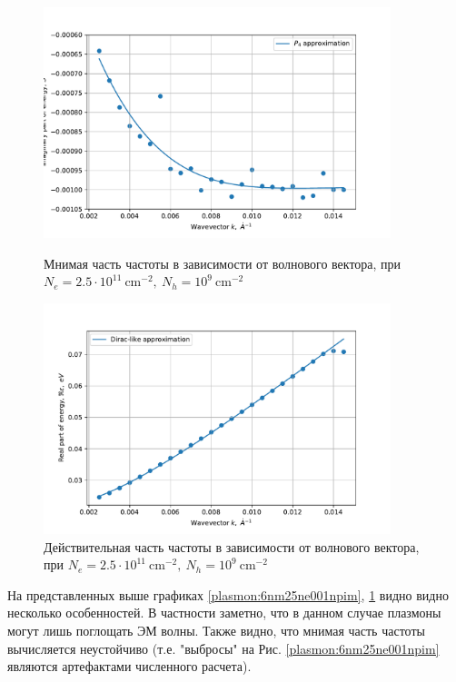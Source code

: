 \documentclass[../main.tex]{subfiles}
\begin{document}
    \begin{figure}[h]
        \begin{minipage}[h]{0.49\textwidth}
            \includegraphics[width=0.9\textwidth]{./images/plasmon_6nm_25_001_im.pdf}
            \caption{Мнимая часть частоты в зависимости от волнового вектора, при $N_e = 2.5 \cdot 10^{11}~\text{cm}^{-2},~N_h = 10^9~\text{cm}^{-2}$
            \label{plasmon:6nm25ne001npim}}
        \end{minipage}
        \hfill
        \begin{minipage}[h]{0.49\textwidth}
            \includegraphics[width=0.9\textwidth]{./images/plasmon_6nm_25_001_re.pdf}
            \caption{Действительная часть частоты в зависимости от волнового вектора, при $N_e = 2.5 \cdot 10^{11}~\text{cm}^{-2},~N_h = 10^9~\text{cm}^{-2}$
            \label{plasmon:6nm25ne001npre}}
        \end{minipage}
    \end{figure}

    На представленных выше графиках \ref{plasmon:6nm25ne001npim}, \ref{plasmon:6nm25ne001npre} видно видно несколько особенностей.
    В частности заметно, что в данном случае плазмоны могут лишь поглощать ЭМ волны. Также видно, что мнимая часть частоты вычисляется 
    неустойчиво (т.е. "выбросы" на Рис. \ref{plasmon:6nm25ne001npim} являются артефактами численного расчета).
\end{document}
